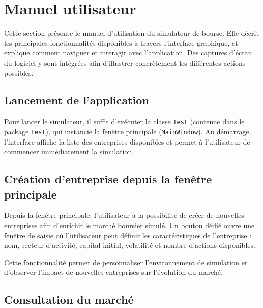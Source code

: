 \newpage
\section{Manuel utilisateur}
\label{sec:manuel}



Cette section présente le manuel d’utilisation du simulateur de bourse.  
Elle décrit les principales fonctionnalités disponibles à travers l’interface graphique, et explique comment naviguer et interagir avec l’application.  
Des captures d'écran du logiciel y sont intégrées afin d'illustrer concrètement les différentes actions possibles.

\subsection{Lancement de l'application}

Pour lancer le simulateur, il suffit d’exécuter la classe \texttt{Test} (contenue dans le package \texttt{test}), qui instancie la fenêtre principale (\texttt{MainWindow}).  
Au démarrage, l’interface affiche la liste des entreprises disponibles et permet à l'utilisateur de commencer immédiatement la simulation.


\vspace{8.5cm}
\subsection{Création d'entreprise depuis la fenêtre principale}

Depuis la fenêtre principale, l’utilisateur a la possibilité de créer de nouvelles entreprises afin d’enrichir le marché boursier simulé.  
Un bouton dédié ouvre une fenêtre de saisie où l'utilisateur peut définir les caractéristiques de l'entreprise : nom, secteur d'activité, capital initial, volatilité et nombre d'actions disponibles.

Cette fonctionnalité permet de personnaliser l’environnement de simulation et d'observer l'impact de nouvelles entreprises sur l’évolution du marché.





\vspace{0.5cm}
\subsection{Consultation du marché}

